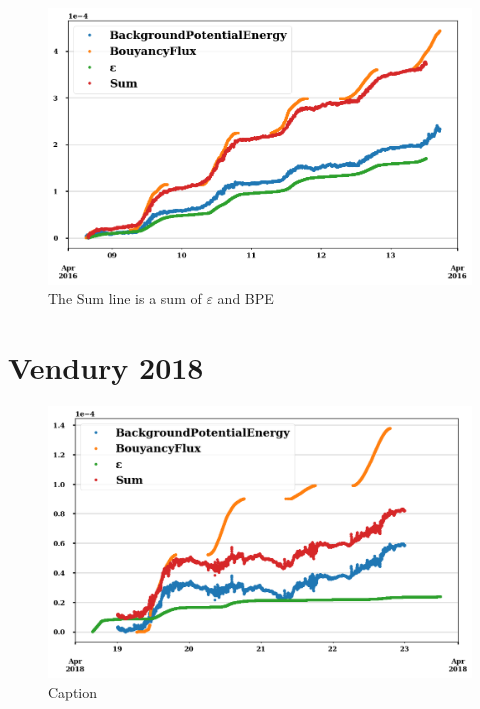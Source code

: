 \documentclass{article}
\begin{document}
\begin{figure}
    \centering
    \includegraphics[width=\textwidth]{vend2016.png}
    \caption{The Sum line is a sum of $\varepsilon$ and BPE}
    \label{fig:my_label}
\end{figure}

\section{Vendury 2018}

\begin{figure}
    \centering
    \includegraphics[width=\textwidth]{vend2018.png}
    \caption{Caption}
    \label{fig:vend2018}
\end{figure}
\end{document}
